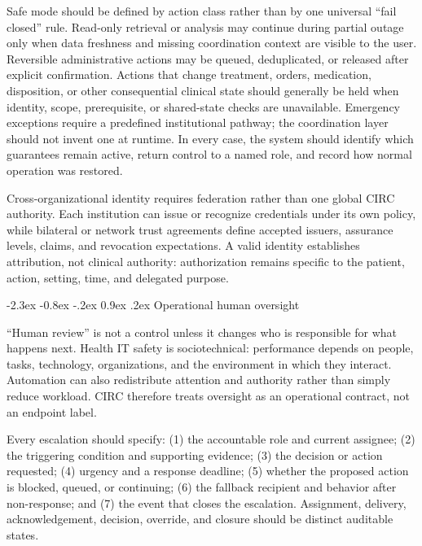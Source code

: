 \documentclass[10pt]{article}
\makeatletter
\renewcommand\section{\@startsection{section}{1}{\z@}%
  {-2.3ex \@plus -0.8ex \@minus -.2ex}%
  {0.9ex \@plus .2ex}%
  {\normalfont\sffamily\bfseries\normalsize}}
\makeatother
\begin{document}
Safe mode should be defined by action class rather than by one universal ``fail closed'' rule.
Read-only retrieval or analysis may continue during partial outage only when data freshness and
missing coordination context are visible to the user. Reversible administrative actions may be
queued, deduplicated, or released after explicit confirmation. Actions that change treatment, orders,
medication, disposition, or other consequential clinical state should generally be held when identity,
scope, prerequisite, or shared-state checks are unavailable. Emergency exceptions require a
predefined institutional pathway; the coordination layer should not invent one at runtime. In every
case, the system should identify which guarantees remain active, return control to a named role, and
record how normal operation was restored.

Cross-organizational identity requires federation rather than one global CIRC authority. Each
institution can issue or recognize credentials under its own policy, while bilateral or network trust
agreements define accepted issuers, assurance levels, claims, and revocation expectations. A valid
identity establishes attribution, not clinical authority: authorization remains specific to the
patient, action, setting, time, and delegated purpose.

\section{Operational human oversight}

``Human review'' is not a control unless it changes who is responsible for what happens next. Health
IT safety is sociotechnical: performance depends on people, tasks, technology, organizations, and the
environment in which they interact.\cite{sittig2010sociotechnical,carayon2006seips} Automation can
also redistribute attention and authority rather than simply reduce workload.\cite{parasuraman2000automation}
CIRC therefore treats oversight as an operational contract, not an endpoint label.

Every escalation should specify: (1) the accountable role and current assignee; (2) the triggering
condition and supporting evidence; (3) the decision or action requested; (4) urgency and a response
deadline; (5) whether the proposed action is blocked, queued, or continuing; (6) the fallback recipient
and behavior after non-response; and (7) the event that closes the escalation. Assignment, delivery,
acknowledgement, decision, override, and closure should be distinct auditable states.
\end{document}
